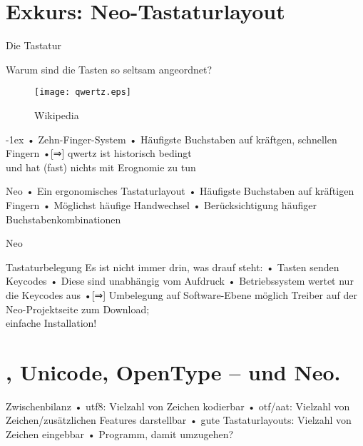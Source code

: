\section{Exkurs: Neo-Tastaturlayout}
\begin{frame}{Die Tastatur}
\centerline{Warum sind die Tasten so seltsam angeordnet?}
\begin{figure}
\texttt{[image: qwertz.eps]}
\caption{ Wikipedia}
\end{figure}
\pause\kern-1ex
• Zehn-Finger-System
• Häufigste Buchstaben auf kräftgen, schnellen Fingern%
\pause%
•[⇒] \alert{qwertz ist historisch bedingt\\ und hat (fast) nichts mit Erognomie zu tun}
\• 
\end{frame}

\begin{frame}{Neo}
• Ein ergonomisches Tastaturlayout
• Häufigste Buchstaben auf kräftigen Fingern
• Möglichst häufige Handwechsel
• Berücksichtigung häufiger Buchstabenkombinationen
\•
\end{frame}

\begin{frame}{Neo}
\begin{figure}
\end{figure}
\end{frame}

\begin{frame}{Tastaturbelegung}
Es ist nicht immer drin, was drauf steht:
• Tasten senden Keycodes
• Diese sind unabhängig vom Aufdruck
• Betriebssystem wertet nur die Keycodes aus
•[⇒] Umbelegung auf Software-Ebene möglich%
\•
\pause
Treiber auf der Neo-Projektseite zum Download;\\ einfache Installation!
\end{frame}

\section{\XeLaTeX, Unicode, OpenType – und Neo.}
\begin{frame}{Zwischenbilanz}
• utf8: Vielzahl von Zeichen kodierbar
• otf/aat: Vielzahl von Zeichen/zusätzlichen Features darstellbar
• gute Tastaturlayouts: Vielzahl von Zeichen eingebbar
• Programm, damit umzugehen?
\•
\end{frame}

